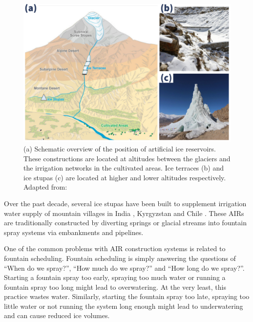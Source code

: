 \documentclass[tc, manuscript]{copernicus}
\begin{document}
\begin{figure}[t]
\includegraphics[width=12cm]{Figures/AIR_forms.jpg}

\caption{(a) Schematic overview of the position of artificial ice reservoirs. These constructions are located at
altitudes between the glaciers and the irrigation networks in the cultivated areas. Ice terraces (b) and ice
stupas (c) are located at higher and lower altitudes respectively. Adapted from:
\cite{nusserLocalKnowledgeGlobal2016}}

\label{fig:AIRforms}
\end{figure}

Over the past decade, several ice stupas have been built to supplement irrigation water supply of mountain
villages in India \citep{wangchukIceStupaCompetition2020, palmerStoringFrozenWater2022,
aggarwalAdaptationClimateChange2021}, Kyrgyzstan \citep{bbcnewsBrightArtificialGlacier2020} and Chile
\citep{reutersConservationistsChileAim2021}. These AIRs are traditionally constructed by diverting springs or
glacial streams into fountain spray systems via embankments and pipelines. 

One of the common problems with AIR construction systems is related to fountain scheduling. Fountain scheduling
is simply answering the questions of “When do we spray?”, “How much do we spray?” and “How long do we spray?”.
Starting a fountain spray too early, spraying too much water or running a fountain spray too long might lead to
overwatering. At the very least, this practice wastes water.  Similarly, starting the fountain spray too late,
spraying too little water or not running the system long enough might lead to underwatering and can cause
reduced ice volumes.
\end{document}
